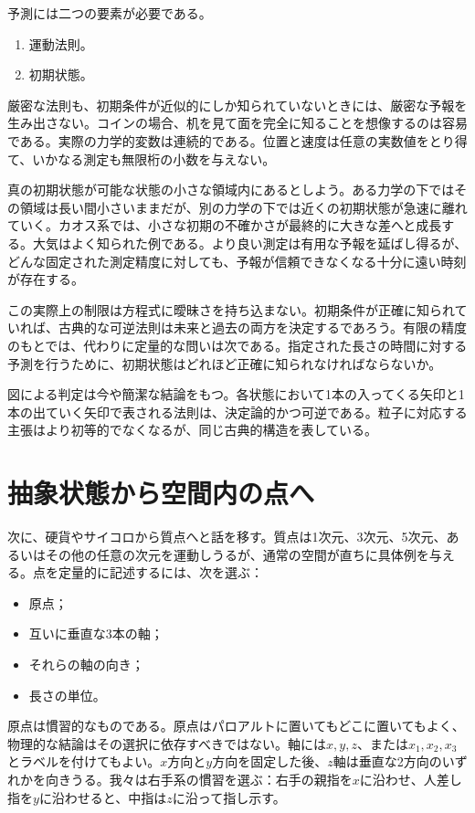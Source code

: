 予測には二つの要素が必要である。
\begin{enumerate}
  \item 運動法則。
  \item 初期状態。
\end{enumerate}
厳密な法則も、初期条件が近似的にしか知られていないときには、厳密な予報を生み出さない。コインの場合、机を見て面を完全に知ることを想像するのは容易である。実際の力学的変数は連続的である。位置と速度は任意の実数値をとり得て、いかなる測定も無限桁の小数を与えない。

真の初期状態が可能な状態の小さな領域内にあるとしよう。ある力学の下ではその領域は長い間小さいままだが、別の力学の下では近くの初期状態が急速に離れていく。カオス系では、小さな初期の不確かさが最終的に大きな差へと成長する。大気はよく知られた例である。より良い測定は有用な予報を延ばし得るが、どんな固定された測定精度に対しても、予報が信頼できなくなる十分に遠い時刻が存在する。

この実際上の制限は方程式に曖昧さを持ち込まない。初期条件が正確に知られていれば、古典的な可逆法則は未来と過去の両方を決定するであろう。有限の精度のもとでは、代わりに定量的な問いは次である。指定された長さの時間に対する予測を行うために、初期状態はどれほど正確に知られなければならないか。

図による判定は今や簡潔な結論をもつ。各状態において1本の入ってくる矢印と1本の出ていく矢印で表される法則は、決定論的かつ可逆である。粒子に対応する主張はより初等的でなくなるが、同じ古典的構造を表している。

\section{抽象状態から空間内の点へ}

次に、硬貨やサイコロから質点へと話を移す。質点は1次元、3次元、5次元、あるいはその他の任意の次元を運動しうるが、通常の空間が直ちに具体例を与える。点を定量的に記述するには、次を選ぶ：
\begin{itemize}
  \item 原点；
  \item 互いに垂直な3本の軸；
  \item それらの軸の向き；
  \item 長さの単位。
\end{itemize}
原点は慣習的なものである。原点はパロアルトに置いてもどこに置いてもよく、物理的な結論はその選択に依存すべきではない。軸には\(x,y,z\)、または\(x_1,x_2,x_3\)とラベルを付けてもよい。\(x\)方向と\(y\)方向を固定した後、\(z\)軸は垂直な2方向のいずれかを向きうる。我々は右手系の慣習を選ぶ：右手の親指を\(x\)に沿わせ、人差し指を\(y\)に沿わせると、中指は\(z\)に沿って指し示す。

